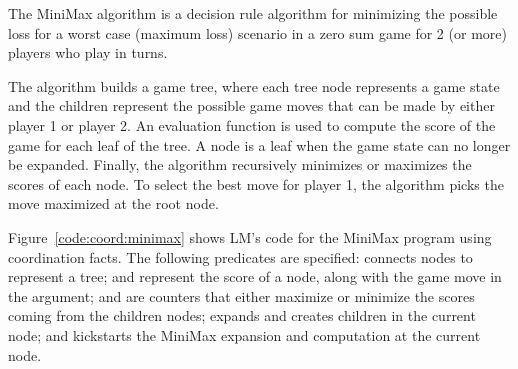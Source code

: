 The MiniMax algorithm is a decision rule algorithm for minimizing the possible
loss for a worst case (maximum loss) scenario in a zero sum game for 2 (or more)
players who play in turns.

The algorithm builds a game tree, where each tree node represents a game state
and the children represent the possible game moves that can be made by either
player 1 or player 2.  An evaluation function is used to compute the score of
the game for each leaf of the tree. A node is a leaf when the game state can no
longer be expanded. Finally, the algorithm recursively minimizes or maximizes
the scores of each node. To select the best move for player 1, the algorithm
picks the move maximized at the root node.

Figure~\ref{code:coord:minimax} shows LM's code for the MiniMax program using
coordination facts. The following predicates are specified: 
connects nodes to represent a tree;  and
 represent the score of a node, along with the
game move in the  argument;  and  are
counters that either maximize or minimize the scores coming from the children
nodes;  expands and creates children in the current node; and
 kickstarts the MiniMax expansion and computation at the current node.

